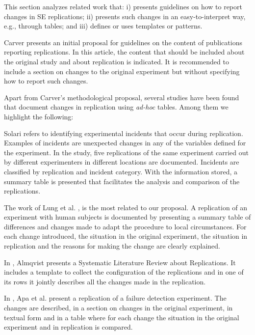 

This section analyzes related work that: i) presents guidelines on how to report changes in SE replications; ii) presents such changes in an easy-to-interpret way, e.g., through tables; and iii) defines or uses templates or patterns.

Carver \cite{carver2010towards} presents an initial proposal for guidelines on the content of publications reporting replications. In this article, the content that should be included about the original study and about replication is indicated. It is recommended to include a section on changes to the original experiment but without specifying how to report such changes.

Apart from Carver's methodological proposal, several studies have been found that document changes in replication using \emph{ad-hoc} tables. Among them we highlight the following:

Solari \cite{solari2013identifying} refers to identifying experimental incidents that occur during replication. Examples of incidents are unexpected changes in any of the variables defined for the experiment. In the study, five replications of the same experiment carried out by different experimenters in different locations are documented. Incidents are classified by replication and incident category. With the information stored, a summary table is presented that facilitates the analysis and comparison of the replications.

The work of Lung et al. \cite{lung2008difficulty}, is the most related to our proposal. A replication of an experiment with human subjects is documented by presenting a summary table of differences and changes made to adapt the procedure to local circumstances. For each change introduced, the situation in the original experiment, the situation in replication and the reasons for making the change are clearly explained. 

In \cite{1330459}, Almqvist presents a Systematic Literature Review about Replications. It includes a template to collect the configuration of the replications and in one of its rows it jointly describes all the changes made in the replication.

In \cite{apa2014effectiveness}, Apa et al. present a replication of a failure detection experiment. The changes are described, in a section on changes in the original experiment, in textual form and in a table where for each change the situation in the original experiment and in replication is compared.

